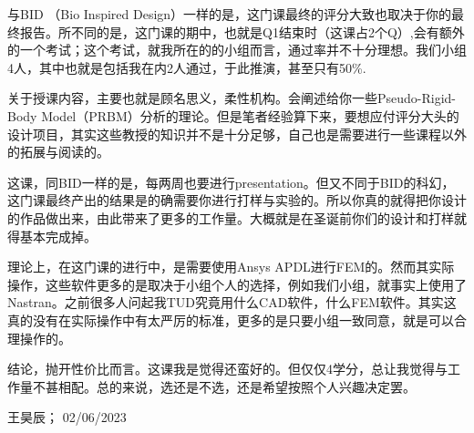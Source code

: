 与BID （Bio Inspired Design）一样的是，这门课最终的评分大致也取决于你的最终报告。所不同的是，这门课的期中，也就是Q1结束时（这课占2个Q）,会有额外的一个考试；这个考试，就我所在的的小组而言，通过率并不十分理想。我们小组4人，其中也就是包括我在内2人通过，于此推演，甚至只有50\%.

关于授课内容，主要也就是顾名思义，柔性机构。会阐述给你一些Pseudo-Rigid-Body Model（PRBM）分析的理论。但是笔者经验算下来，要想应付评分大头的设计项目，其实这些教授的知识并不是十分足够，自己也是需要进行一些课程以外的拓展与阅读的。

这课，同BID一样的是，每两周也要进行presentation。但又不同于BID的科幻，这门课最终产出的结果是的确需要你进行打样与实验的。所以你真的就得把你设计的作品做出来，由此带来了更多的工作量。大概就是在圣诞前你们的设计和打样就得基本完成掉。

理论上，在这门课的进行中，是需要使用Ansys APDL进行FEM的。然而其实际操作，这些软件更多的是取决于小组个人的选择，例如我们小组，就事实上使用了Nastran。之前很多人问起我TUD究竟用什么CAD软件，什么FEM软件。其实这真的没有在实际操作中有太严厉的标准，更多的是只要小组一致同意，就是可以合理操作的。

结论，抛开性价比而言。这课我是觉得还蛮好的。但仅仅4学分，总让我觉得与工作量不甚相配。总的来说，选还是不选，还是希望按照个人兴趣决定罢。
\begin{flushright}
王昊辰； 02/06/2023
\end{flushright}

